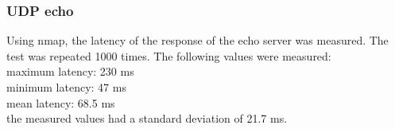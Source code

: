 \subsubsection{UDP echo}
Using nmap, the latency of the response of the echo server was measured. The test was repeated 1000 times. The following values were measured:\\
maximum latency: 230 ms\\
minimum latency: 47 ms\\
mean latency: 68.5 ms\\
the measured values had a standard deviation of 21.7 ms.


